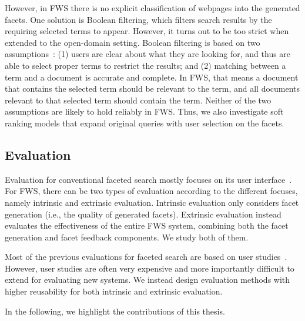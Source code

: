 However, in FWS there is no explicit classification of webpages into the generated facets. One solution is Boolean filtering, which filters search results by the requiring selected terms to appear. However, it turns out to be too strict when extended to the open-domain setting. Boolean filtering is based on two assumptions~\cite{zhang2010interactive}: (1) users are clear about what they are looking for, and thus are able to select proper terms to restrict the results; and (2) matching between a term and a document is accurate and complete. In FWS, that means a document that contains the selected term should be relevant to the term, and all documents relevant to that selected term should contain the term. Neither of the two assumptions are likely to hold reliably in FWS. Thus, we also investigate soft ranking models that expand original queries with user selection on the facets.
  

\subsection{Evaluation}
Evaluation for conventional faceted search mostly focuses on its user interface~\cite{burke1996knowledge,english2002hierarchical,hearst2006design,hearst2008uis,kules2009exploratory}. For FWS, there can be two types of evaluation according to the different focuses, namely intrinsic and extrinsic evaluation. Intrinsic evaluation only considers facet generation (i.e., the quality of generated facets).  Extrinsic evaluation instead evaluates the effectiveness of the entire FWS system, combining both the facet generation and facet feedback components. We study both of them.

Most of the previous evaluations for faceted search are based on user studies~\cite{dash2008dynamic,li2010facetedpedia,stoica2007automating}. However, user studies are often very expensive and more importantly difficult to extend for evaluating new systems. We instead design evaluation methods with higher reusability for both intrinsic and extrinsic evaluation.

In the following, we highlight the contributions of this thesis.

